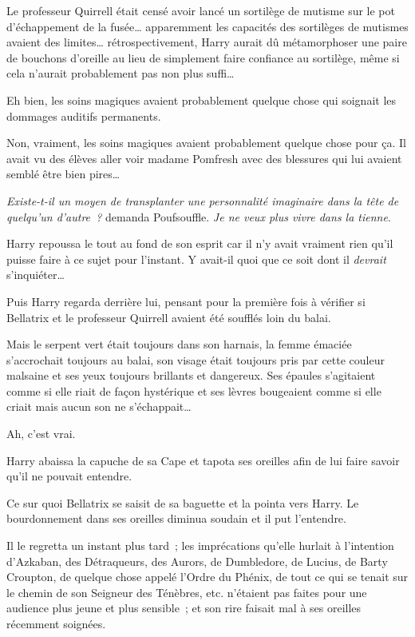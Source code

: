 Le professeur Quirrell était censé avoir lancé un sortilège de mutisme sur le pot d'échappement de la fusée… apparemment les capacités des sortilèges de mutismes avaient des limites… rétrospectivement, Harry aurait dû métamorphoser une paire de bouchons d'oreille au lieu de simplement faire confiance au sortilège, même si cela n'aurait probablement pas non plus suffi…

Eh bien, les soins magiques avaient probablement quelque chose qui soignait les dommages auditifs permanents.

Non, vraiment, les soins magiques avaient probablement quelque chose pour ça.
Il avait vu des élèves aller voir madame Pomfresh avec des blessures qui lui avaient semblé être bien pires…

\emph{Existe-t-il un moyen de transplanter une personnalité imaginaire dans la tête de quelqu'un d'autre~?} demanda Poufsouffle.
\emph{Je ne veux plus vivre dans la tienne}.

Harry repoussa le tout au fond de son esprit car il n'y avait vraiment rien qu'il puisse faire à ce sujet pour l'instant.
Y avait-il quoi que ce soit dont il \emph{devrait} s'inquiéter…

Puis Harry regarda derrière lui, pensant pour la première fois à vérifier si Bellatrix et le professeur Quirrell avaient été soufflés loin du balai.

Mais le serpent vert était toujours dans son harnais, la femme émaciée s'accrochait toujours au balai, son visage était toujours pris par cette couleur malsaine et ses yeux toujours brillants et dangereux.
Ses épaules s'agitaient comme si elle riait de façon hystérique et ses lèvres bougeaient comme si elle criait mais aucun son ne s'échappait…

Ah, c'est vrai.

Harry abaissa la capuche de sa Cape et tapota ses oreilles afin de lui faire savoir qu'il ne pouvait entendre.

Ce sur quoi Bellatrix se saisit de sa baguette et la pointa vers Harry.
Le bourdonnement dans ses oreilles diminua soudain et il put l'entendre.

Il le regretta un instant plus tard~; les imprécations qu'elle hurlait à l'intention d'Azkaban, des Détraqueurs, des Aurors, de Dumbledore, de Lucius, de Barty Croupton, de quelque chose appelé l'Ordre du Phénix, de tout ce qui se tenait sur le chemin de son Seigneur des Ténèbres, etc. n'étaient pas faites pour une audience plus jeune et plus sensible~; et son rire faisait mal à ses oreilles récemment soignées.

